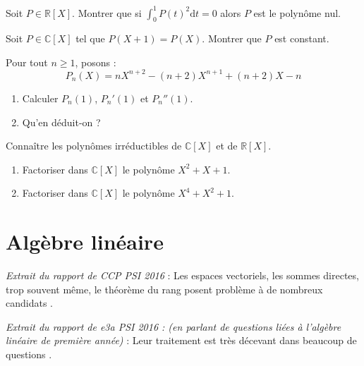 \documentclass[a4paper,twoside,french,11pt]{VcCours}
\newcommand{\dt}{\text{d}t}
\begin{document}


\begin{Exercice}{}
  Soit $P \in \mathbb{R}[X]$. Montrer que si $\int_0^1 P(t)^2 \dt= 0$ alors $P$ est le polynôme nul.
\end{Exercice} 

\begin{Exercice}{}
  Soit $P \in \mathbb{C}[X]$ tel que $P(X+1)=P(X)$. Montrer que $P$ est constant.
\end{Exercice} 

\begin{Exercice}{}
  Pour tout $n \geq 1$, posons :
  $$ P_n(X) = n X^{n+2} - (n+2)X^{n+1} + (n+2)X -n $$
  \begin{enumerate}
    \item Calculer $P_n(1)$, $P_n'(1)$ et $P_n''(1)$.
    \item Qu'en déduit-on ?
  \end{enumerate}
\end{Exercice} 
  
\begin{ptc}{}
	Connaître les polynômes irréductibles de $\mathbb{C}[X]$ et de $\mathbb{R}[X]$.
\end{ptc}

\begin{Exercice}{}
  
  \begin{enumerate}
    \item Factoriser dans $\mathbb{C}[X]$ le polynôme $X^2+X+1$.
    \item Factoriser dans $\mathbb{C}[X]$ le polynôme $X^4+X^2+1$.
  \end{enumerate}
\end{Exercice} 
  
\section{Algèbre linéaire}

\textit{Extrait du rapport de CCP PSI 2016} : \og Les espaces vectoriels, les sommes directes, trop souvent même, le théorème du rang posent problème à de nombreux candidats \fg .

\textit{Extrait du rapport de e3a PSI 2016 : (en parlant de questions liées à l'algèbre linéaire de première \newline année) } : \og Leur traitement est très décevant dans beaucoup de questions \fg .
\end{document}
